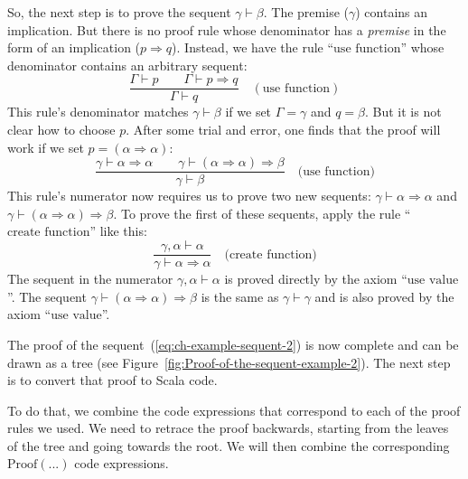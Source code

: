 So, the next step is to prove the sequent $\gamma\vdash\beta$. The
premise ($\gamma$) contains an implication. But there is no proof
rule whose denominator has a \emph{premise} in the form of an implication
($p\Rightarrow q$). Instead, we have the rule \textsf{``}$\text{use function}$\textsf{''}
whose denominator contains an arbitrary sequent:
\[
\frac{\Gamma\vdash p\quad\quad\Gamma\vdash p\Rightarrow q}{\Gamma\vdash q}\quad(\text{use function})
\]
This rule\textsf{'}s denominator matches $\gamma\vdash\beta$ if we set $\Gamma=\gamma$
and $q=\beta$. But it is not clear how to choose $p$. After some
trial and error, one finds that the proof will work if we set $p=(\alpha\Rightarrow\alpha)$:
\[
\frac{\gamma\vdash\alpha\Rightarrow\alpha\quad\quad\gamma\vdash(\alpha\Rightarrow\alpha)\Rightarrow\beta}{\gamma\vdash\beta}\quad\text{(use function)}
\]
This rule\textsf{'}s numerator now requires us to prove two new sequents: $\gamma\vdash\alpha\Rightarrow\alpha$
and $\gamma\vdash(\alpha\Rightarrow\alpha)\Rightarrow\beta$. To prove
the first of these sequents, apply the rule \textsf{``}$\text{create function}$\textsf{''}
like this:
\[
\frac{\gamma,\alpha\vdash\alpha}{\gamma\vdash\alpha\Rightarrow\alpha}\quad\text{(create function)}
\]
The sequent in the numerator $\gamma,\alpha\vdash\alpha$ is proved
directly by the axiom \textsf{``}$\text{use value}$\textsf{''}. The sequent $\gamma\vdash(\alpha\Rightarrow\alpha)\Rightarrow\beta$
is the same as $\gamma\vdash\gamma$ and is also proved by the axiom
\textsf{``}$\text{use value}$\textsf{''}.

The proof of the sequent~(\ref{eq:ch-example-sequent-2}) is now
complete and can be drawn as a tree (see Figure~\ref{fig:Proof-of-the-sequent-example-2}).
The next step is to convert that proof to Scala code.

To do that, we combine the code expressions that correspond to each
of the proof rules we used. We need to retrace the proof backwards,
starting from the leaves of the tree and going towards the root. We
will then combine the corresponding $\text{Proof}\left(...\right)$
code expressions.

